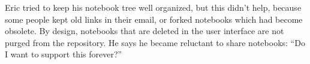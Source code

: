 Eric tried to keep his notebook tree well organized, but this didn't help,
because some people kept old links in their email, or forked notebooks which 
had become obsolete. By design, notebooks that are deleted in the user interface
are not purged from the repository. He says he became reluctant to share notebooks:
``Do I want to support this forever?''

